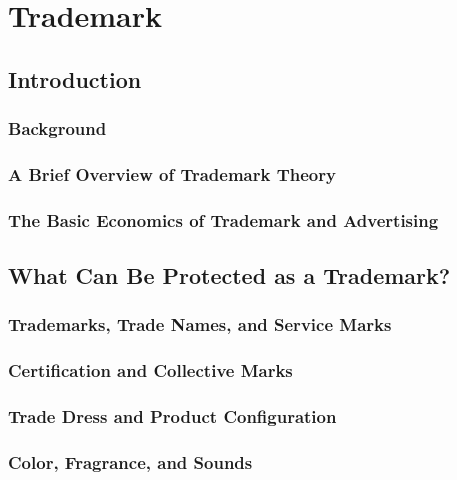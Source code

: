 \section{Trademark}

\subsection{Introduction}

\subsubsection{Background}


\subsubsection{A Brief Overview of Trademark Theory}


\subsubsection{The Basic Economics of Trademark and Advertising}


\subsection{What Can Be Protected as a Trademark?}

\subsubsection{Trademarks, Trade Names, and Service Marks}


\subsubsection{Certification and Collective Marks}


\subsubsection{Trade Dress and Product Configuration}


\subsubsection{Color, Fragrance, and Sounds}

